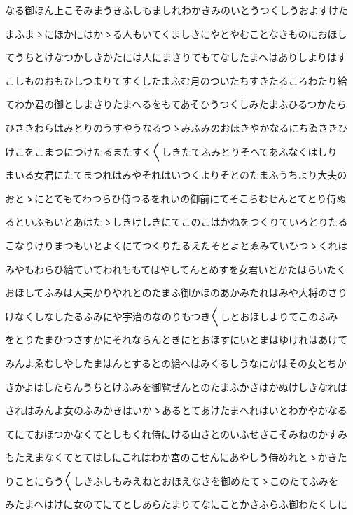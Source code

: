 \documentclass[a4paper,11pt,landscape]{ltjtarticle}
\begin{document}
なる御ほん上こそみまうきふしもましれわかきみのいとうつくしうおよすけた
\par\medskip
まふまゝにほかにはかゝる人もいてくましきにやとやむことなきものにおほし
\par\medskip
てうちとけなつかしきかたには人にまさりてもてなしたまへはありしよりはす
\par\medskip
こしものおもひしつまりてすくしたまふむ月のついたちすきたるころわたり給
\par\medskip
てわか君の御としまさりたまへるをもてあそひうつくしみたまふひるつかたち
\par\medskip
ひさきわらはみとりのうすやうなるつゝみふみのおほきやかなるにちゐさきひ
\par\medskip
けこをこまつにつけたるまたすく〱しきたてふみとりそへてあふなくはしり
\par\medskip
まいる女君にたてまつれはみやそれはいつくよりそとのたまふうちより大夫の
\par\medskip
おとゝにとてもてわつらひ侍つるをれいの御前にてそこらむせんとてとり侍ぬ
\par\medskip
るといふもいとあはたゝしきけしきにてこのこはかねをつくりていろとりたる
\par\medskip
こなりけりまつもいとよくにてつくりたるえたそとよとゑみていひつゝくれは
\par\medskip
みやもわらひ給ていてわれももてはやしてんとめすを女君いとかたはらいたく
\par\medskip
おほしてふみは大夫かりやれとのたまふ御かほのあかみたれはみや大将のさり
\par\medskip
けなくしなしたるふみにや宇治のなのりもつき〱しとおほしよりてこのふみ
\par\medskip
をとりたまひつさすかにそれならんときにとおほすにいとまはゆけれはあけて
\par\medskip
みんよゑむしやしたまはんとするとの給へはみくるしうなにかはその女とちか
\par\medskip
きかよはしたらんうちとけふみを御覧せんとのたまふかさはかぬけしきなれは
\par\medskip
されはみんよ女のふみかきはいかゝあるとてあけたまへれはいとわかやかなる
\par\medskip
てにておほつかなくてとしもくれ侍にける山さとのいふせさこそみねのかすみ
\par\medskip
もたえまなくてとてはしにこれはわか宮のこせんにあやしう侍めれとゝかきた
\par\medskip
りことにらう〱しきふしもみえねとおほえなきを御めたてゝこのたてふみを
\par\medskip
みたまへはけに女のてにてとしあらたまりてなにことかさふらふ御わたくしに
\end{document}
